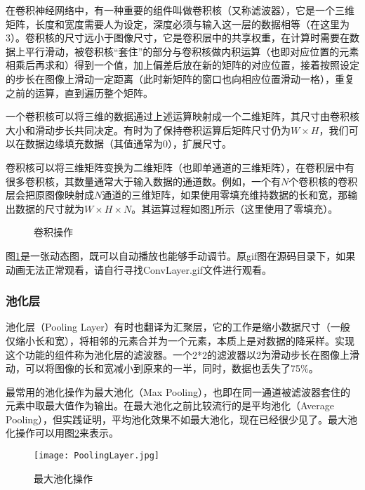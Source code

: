 \documentclass[bwprint]{cumcmthesis}
\begin{document}
在卷积神经网络中，有一种重要的组件叫做卷积核（又称滤波器），它是一个三维矩阵，长度和宽度需要人为设定，深度必须与输入这一层的数据相等（在这里为3）。卷积核的尺寸远小于图像尺寸，它是卷积层中的共享权重，在计算时需要在数据上平行滑动，被卷积核“套住”的部分与卷积核做内积运算（也即对应位置的元素相乘后再求和）得到一个值，加上偏差后放在新的矩阵的对应位置，接着按照设定的步长在图像上滑动一定距离（此时新矩阵的窗口也向相应位置滑动一格），重复之前的运算，直到遍历整个矩阵。

一个卷积核可以将三维的数据通过上述运算映射成一个二维矩阵，其尺寸由卷积核大小和滑动步长共同决定。有时为了保持卷积运算后矩阵尺寸仍为$W\times H$，我们可以在数据边缘填充数据（其值通常为0），扩展尺寸。

卷积核可以将三维矩阵变换为二维矩阵（也即单通道的三维矩阵），在卷积层中有很多卷积核，其数量通常大于输入数据的通道数。例如，一个有$N$个卷积核的卷积层会把原图像映射成$N$通道的三维矩阵，如果使用零填充维持数据的长和宽，那输出数据的尺寸就为$W\times H\times N$。其运算过程如图\ref{convBlock}所示（这里使用了零填充）。

\begin{figure}[!h]
	\centering
	\caption{卷积操作\cite{cs231n}}
	\label{convBlock}
\end{figure}

图\ref{convBlock}是一张动态图，既可以自动播放也能够手动调节。原gif图在源码目录下，如果动画无法正常观看，请自行寻找ConvLayer.gif文件进行观看。

\subsubsection{池化层}

池化层（Pooling Layer）有时也翻译为汇聚层，它的工作是缩小数据尺寸（一般仅缩小长和宽），将相邻的元素合并为一个元素，本质上是对数据的降采样。实现这个功能的组件称为池化层的滤波器。一个2*2的滤波器以2为滑动步长在图像上滑动，可以将图像的长和宽减小到原来的一半，同时，数据也丢失了75\%。

最常用的池化操作为最大池化（Max Pooling），也即在同一通道被滤波器套住的元素中取最大值作为输出。在最大池化之前比较流行的是平均池化（Average Pooling），但实践证明，平均池化效果不如最大池化\cite{cs231n}，现在已经很少见了。最大池化操作可以用图\ref{poolingBlock}来表示。

\begin{figure}[!h]
	\centering
	\texttt{[image: PoolingLayer.jpg]}
	\caption{最大池化操作\cite{cs231n}}
	\label{poolingBlock}
\end{figure}
\end{document}
